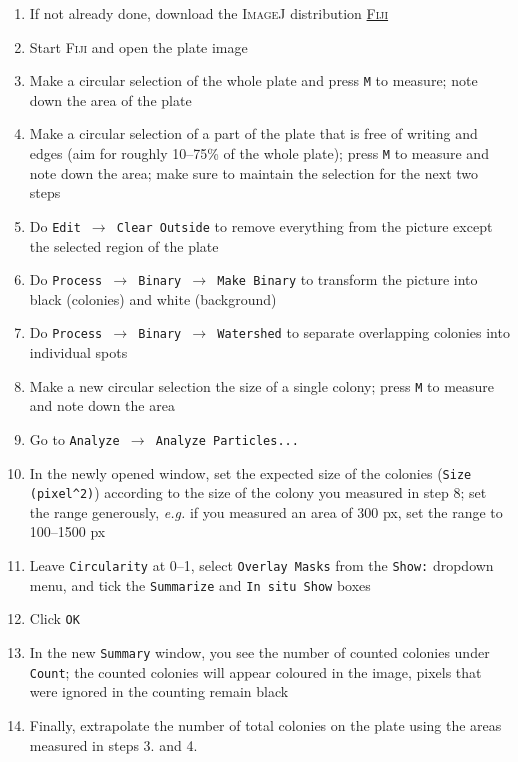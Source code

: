 \documentclass[11pt]{article}
\begin{document}
 	\begin{enumerate}
 		\item If not already done, download the \textsc{ImageJ} distribution \href{https://imagej.net/Fiji/Downloads}{\textsc{Fiji}}
 		\item Start \textsc{Fiji} and open the plate image
 		\item Make a circular selection of the whole plate and press \texttt{M} to measure; note down the area of the plate
 		\item Make a circular selection of a part of the plate that is free of writing and edges (aim for roughly 10--75\% of the whole plate); press \texttt{M} to measure and note down the area; make sure to maintain the selection for the next two steps
 		\item Do \texttt{Edit $\rightarrow$ Clear Outside} to remove everything from the picture except the selected region of the plate
 		\item Do \texttt{Process $\rightarrow$ Binary $\rightarrow$ Make Binary} to transform the picture into black (colonies) and white (background) 
 		\item Do \texttt{Process $\rightarrow$ Binary $\rightarrow$ Watershed} to separate overlapping colonies into individual spots
 		\item Make a new circular selection the size of a single colony; press \texttt{M} to measure and note down the area
 		\item Go to \texttt{Analyze $\rightarrow$ Analyze Particles...}
 		\item In the newly opened window, set the expected size of the colonies (\texttt{Size (pixel\textasciicircum2)}) according to the size of the colony you measured in step 8; set the range generously, \textit{e.g.} if you measured an area of 300 px, set the range to 100--1500 px
 		\item Leave \texttt{Circularity} at 0--1, select \texttt{Overlay Masks} from the \texttt{Show:} dropdown menu, and tick the \texttt{Summarize} and \texttt{In situ Show} boxes
 		\item Click \texttt{OK}
 		\item In the new \texttt{Summary} window, you see the number of counted colonies under \texttt{Count}; the counted colonies will appear coloured in the image, pixels that were ignored in the counting remain black
 		\item Finally, extrapolate the number of total colonies on the plate using the areas measured in steps 3. and 4.
 	\end{enumerate}
 		
\end{document}
